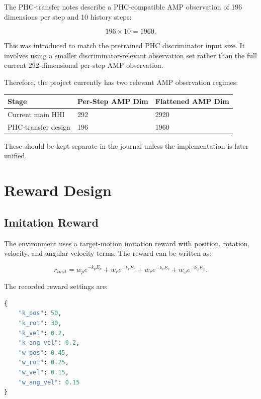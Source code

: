 \documentclass[11pt,a4paper]{article}
\begin{document}
The PHC-transfer notes describe a PHC-compatible AMP observation of 196 dimensions per step and 10 history steps:

\begin{equation}
    196 \times 10 = 1960.
\end{equation}

This was introduced to match the pretrained PHC discriminator input size. It involves using a smaller discriminator-relevant observation set rather than the full current 292-dimensional per-step AMP observation.

Therefore, the project currently has two relevant AMP observation regimes:

\begin{center}
    \begin{tabular}{lll}
        \toprule
        Stage               & Per-Step AMP Dim & Flattened AMP Dim \\
        \midrule
        Current main HHI    & 292              & 2920              \\
        PHC-transfer design & 196              & 1960              \\
        \bottomrule
    \end{tabular}
\end{center}

These should be kept separate in the journal unless the implementation is later unified.

\section{Reward Design}

\subsection{Imitation Reward}

The environment uses a target-motion imitation reward with position, rotation, velocity, and angular velocity terms. The reward can be written as:

\begin{equation}
    r_{imit} =
    w_p e^{-k_p E_p}
    + w_r e^{-k_r E_r}
    + w_v e^{-k_v E_v}
    + w_\omega e^{-k_\omega E_\omega}.
\end{equation}

The recorded reward settings are:

\begin{lstlisting}[language=Python]
{
    "k_pos": 50,
    "k_rot": 30,
    "k_vel": 0.2,
    "k_ang_vel": 0.2,
    "w_pos": 0.45,
    "w_rot": 0.25,
    "w_vel": 0.15,
    "w_ang_vel": 0.15
}
\end{lstlisting}
\end{document}
